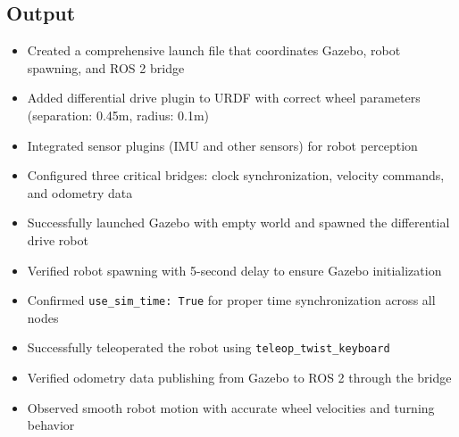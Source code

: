 \subsection{Output}
\begin{itemize}
	\item Created a comprehensive launch file that coordinates Gazebo, robot spawning, and ROS 2 bridge
	\item Added differential drive plugin to URDF with correct wheel parameters (separation: 0.45m, radius: 0.1m)
	\item Integrated sensor plugins (IMU and other sensors) for robot perception
	\item Configured three critical bridges: clock synchronization, velocity commands, and odometry data
	\item Successfully launched Gazebo with empty world and spawned the differential drive robot
	\item Verified robot spawning with 5-second delay to ensure Gazebo initialization
	\item Confirmed \texttt{use\_sim\_time: True} for proper time synchronization across all nodes
	\item Successfully teleoperated the robot using \texttt{teleop\_twist\_keyboard}
	\item Verified odometry data publishing from Gazebo to ROS 2 through the bridge
	\item Observed smooth robot motion with accurate wheel velocities and turning behavior
\end{itemize}

